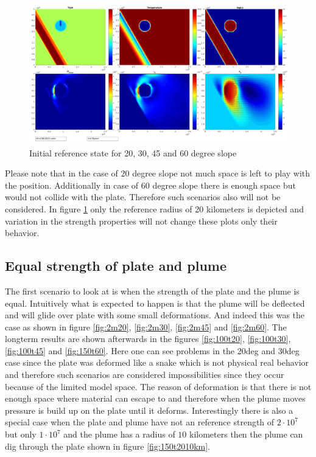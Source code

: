 \documentclass[12pt]{scrartcl}
\begin{document}
\begin{figure}
\begin{minipage}[c]{1.0\textwidth}
\begin{minipage}[t]{0.5\textwidth}
\end{minipage}
\begin{minipage}[t]{0.5\textwidth}
\includegraphics[width=1.0\textwidth]{./Snapshots/ref/Subductionzonewithblob1posrefslab60s2e7s2e7r20.jpg}
\end{minipage}
\end{minipage}
\caption{Initial reference state for 20, 30, 45 and 60 degree slope}
\label{fig:initial}
\end{figure}
Please note that in the case of 20 degree slope not much space is left to play with the position. Additionally in case of 60 degree slope there is enough space but would not collide with the plate. Therefore such scenarios also will not be considered. In figure \ref{fig:initial} only the reference radius of 20 kilometers is depicted and variation in the strength properties will not change these plots only their behavior. 

\subsection{Equal strength of plate and plume}
The first scenario to look at is when the strength of the plate and the plume is equal. Intuitively what is expected to happen is that the plume will be deflected and will glide over plate with some small deformations. And indeed this was the case as shown in figure \ref{fig:2m20}, \ref{fig:2m30}, \ref{fig:2m45} and \ref{fig:2m60}. The longterm results are shown afterwards in the figures \ref{fig:100t20}, \ref{fig:100t30}, \ref{fig:100t45} and \ref{fig:150t60}. Here one can see problems in the 20deg and 30deg case since the plate was deformed like a snake which is not physical real behavior and therefore such scenarios are considered impossibilities since they occur because of the limited model space. The reason of deformation is that there is not enough space where material can escape to and therefore when the plume moves pressure is build up on the plate until it deforms. Interestingly there is also a special case when the plate and plume have not an reference strength of $2\cdot 10^7$ but only $1\cdot 10^7$ and the plume has a radius of $10$ kilometers then the plume can dig through the plate shown in figure \ref{fig:150t2010km}.
\end{document}
